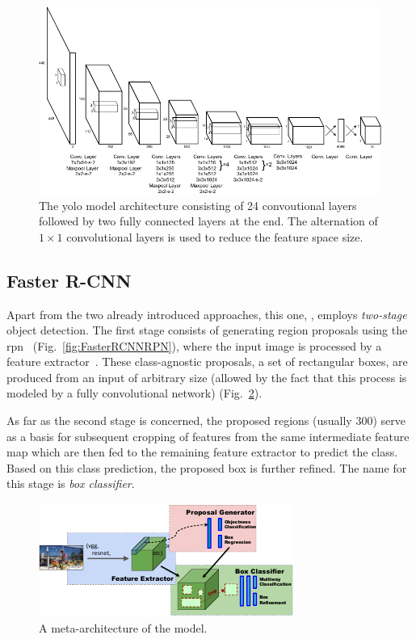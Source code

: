 \begin{figure}[t]
    \centerline{\includegraphics[width=0.8\linewidth]{figures/theoretical_foundations/yolo_architecture.pdf}}
    \caption[\Gls{yolo} architecture]{The \gls{yolo} model architecture consisting of 24 convoutional layers followed by two fully connected layers at the end. The alternation of $1 \times 1$ convolutional layers is used to reduce the feature space size. }
    \label{fig:YOLOArchitecture}
\end{figure}

\subsection{Faster R-CNN}
\label{ssec:FasterRCNN}

Apart from the two already introduced approaches, this one, \fasterrcnn{}, employs \emph{two-stage} object detection. The first stage consists of generating region proposals using the \gls{rpn}~\cite{ren2017fasterrcnn} (Fig.~\ref{fig:FasterRCNNRPN}), where the input image is processed by a feature extractor~\cite{huang2017speedacctradeoff}. These class-agnostic proposals, a set of rectangular boxes, are produced from an input of arbitrary size (allowed by the fact that this process is modeled by a fully convolutional network) (Fig.~\ref{fig:FasterRCNNMetaArch}).

As far as the second stage is concerned, the proposed regions (usually $300$) serve as a basis for subsequent cropping of features from the same intermediate feature map which are then fed to the remaining feature extractor to predict the class. Based on this class prediction, the proposed box is further refined. The name for this stage is \emph{box classifier}.

\begin{figure}[t]
    \centerline{\includegraphics[width=0.7\linewidth]{figures/theoretical_foundations/faster_rcnn_metaarchitecture.pdf}}
    \caption[\fasterrcnn{} meta-architecture]{A meta-architecture of the \fasterrcnn{} model. }
    \label{fig:FasterRCNNMetaArch}
\end{figure}

